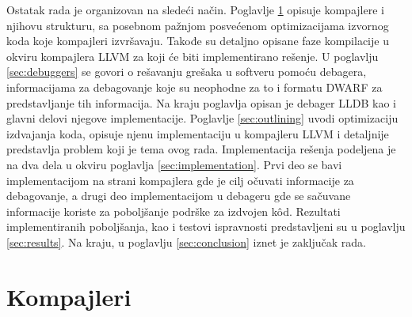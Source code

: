 \documentclass[12pt,oneside]{memoir}
\begin{document}
Ostatak rada je organizovan na sledeći način. %
Poglavlje \ref{sec:compilers} opisuje kompajlere i njihovu strukturu, sa posebnom pažnjom posvećenom optimizacijama izvornog koda koje kompajleri izvršavaju.
Takođe su detaljno opisane faze kompilacije u okviru kompajlera LLVM za koji će biti implementirano rešenje.
U poglavlju \ref{sec:debuggers} se govori o rešavanju grešaka u softveru pomoću debagera, informacijama za debagovanje koje su neophodne za to i formatu DWARF za predstavljanje tih informacija.
Na kraju poglavlja opisan je debager LLDB kao i glavni delovi njegove implementacije.
Poglavlje \ref{sec:outlining} uvodi optimizaciju izdvajanja koda, opisuje njenu implementaciju u kompajleru LLVM i detaljnije predstavlja problem koji je tema ovog rada.
Implementacija rešenja podeljena je na dva dela u okviru poglavlja \ref{sec:implementation}.
Prvi deo se bavi implementacijom na strani kompajlera gde je cilj očuvati informacije za debagovanje, a drugi deo implementacijom u debageru gde se sačuvane informacije koriste za poboljšanje podrške za izdvojen k\^od.
Rezultati implementiranih poboljšanja, kao i testovi ispravnosti predstavljeni su u poglavlju \ref{sec:results}.
Na kraju, u poglavlju \ref{sec:conclusion} iznet je zaključak rada.


\chapter{Kompajleri}
\label{sec:compilers}


\end{document}

